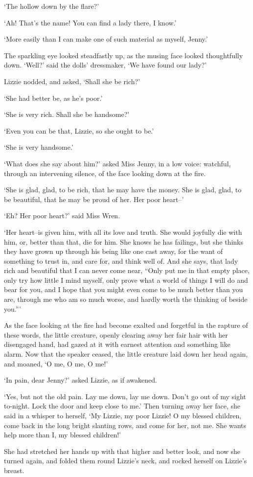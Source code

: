 ‘The hollow down by the flare?’

‘Ah! That’s the name! You can find a lady there, I know.’

‘More easily than I can make one of such material as myself, Jenny.’

The sparkling eye looked steadfastly up, as the musing face looked
thoughtfully down. ‘Well?’ said the dolls’ dressmaker, ‘We have found
our lady?’

Lizzie nodded, and asked, ‘Shall she be rich?’

‘She had better be, as he’s poor.’

‘She is very rich. Shall she be handsome?’

‘Even you can be that, Lizzie, so she ought to be.’

‘She is very handsome.’

‘What does she say about him?’ asked Miss Jenny, in a low voice:
watchful, through an intervening silence, of the face looking down at
the fire.

‘She is glad, glad, to be rich, that he may have the money. She is glad,
glad, to be beautiful, that he may be proud of her. Her poor heart--’

‘Eh? Her poor heart?’ said Miss Wren.

‘Her heart--is given him, with all its love and truth. She would
joyfully die with him, or, better than that, die for him. She knows he
has failings, but she thinks they have grown up through his being like
one cast away, for the want of something to trust in, and care for, and
think well of. And she says, that lady rich and beautiful that I can
never come near, “Only put me in that empty place, only try how little
I mind myself, only prove what a world of things I will do and bear for
you, and I hope that you might even come to be much better than you are,
through me who am so much worse, and hardly worth the thinking of beside
you.”’

As the face looking at the fire had become exalted and forgetful in the
rapture of these words, the little creature, openly clearing away
her fair hair with her disengaged hand, had gazed at it with earnest
attention and something like alarm. Now that the speaker ceased, the
little creature laid down her head again, and moaned, ‘O me, O me, O
me!’

‘In pain, dear Jenny?’ asked Lizzie, as if awakened.

‘Yes, but not the old pain. Lay me down, lay me down. Don’t go out of
my sight to-night. Lock the door and keep close to me.’ Then turning away
her face, she said in a whisper to herself, ‘My Lizzie, my poor Lizzie!
O my blessed children, come back in the long bright slanting rows, and
come for her, not me. She wants help more than I, my blessed children!’

She had stretched her hands up with that higher and better look, and
now she turned again, and folded them round Lizzie’s neck, and rocked
herself on Lizzie’s breast.



